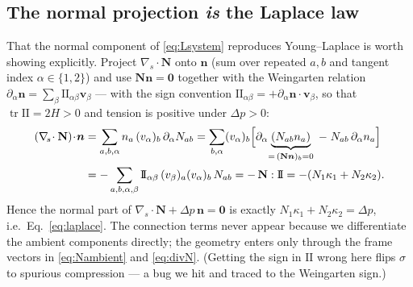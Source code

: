 \documentclass[11pt]{article}
\newcommand{\vv}[1]{\bm{#1}}
\newcommand{\NN}{\mathbf{N}}
\newcommand{\nn}{\vv{n}}
\newcommand{\kone}{\kappa_1}
\newcommand{\ktwo}{\kappa_2}
\newcommand{\divs}{\nabla_{\!s}\!\cdot}
\begin{document}
\subsection{The normal projection \emph{is} the Laplace law}
That the normal component of \eqref{eq:Lsystem} reproduces Young--Laplace is worth showing
explicitly. Project $\divs\NN$ onto $\vv n$ (sum over repeated $a,b$ and tangent index
$\alpha\in\{1,2\}$) and use $\NN\vv n=\vv0$ together with the Weingarten relation
$\partial_\alpha\vv n=\sum_\beta \mathrm{I\!I}_{\alpha\beta}\vv v_\beta$ --- with the sign
convention $\mathrm{I\!I}_{\alpha\beta}=+\partial_\alpha\vv n\!\cdot\!\vv v_\beta$, so that
$\operatorname{tr}\mathrm{I\!I}=2H>0$ and tension is positive under $\Delta p>0$:
\begin{align}
  (\divs\NN)\!\cdot\!\nn
  &=\sum_{a,b,\alpha} n_a\,(v_\alpha)_b\,\partial_\alpha N_{ab}
   =\sum_{b,\alpha}(v_\alpha)_b\Bigl[\partial_\alpha\!\underbrace{(N_{ab}n_a)}_{=\,(\NN\nn)_b=0}
     \;-\;N_{ab}\,\partial_\alpha n_a\Bigr]\notag\\
  &=-\sum_{a,b,\alpha,\beta}\mathrm{I\!I}_{\alpha\beta}\,(v_\beta)_a(v_\alpha)_b\,N_{ab}
   =-\,\NN:\mathrm{I\!I}=-(N_1\kone+N_2\ktwo).
  \label{eq:normalproj}
\end{align}
Hence the normal part of $\divs\NN+\Delta p\,\nn=\vv0$ is exactly
$N_1\kone+N_2\ktwo=\Delta p$, i.e.\ Eq.~\eqref{eq:laplace}. The connection terms never appear
because we differentiate the ambient components directly; the geometry enters only through
the frame vectors in \eqref{eq:Nambient} and \eqref{eq:divN}. (Getting the sign in
$\mathrm{I\!I}$ wrong here flips $\sigma$ to spurious compression --- a bug we hit and traced
to the Weingarten sign.)
\end{document}

